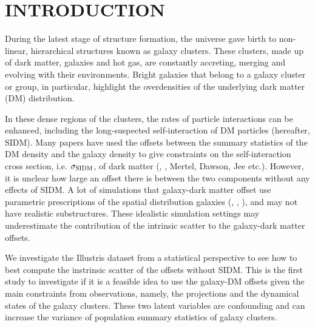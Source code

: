 
\section{INTRODUCTION} 
During the latest stage of structure formation, the universe gave birth to
non-linear, hierarchical structures known as galaxy clusters. 
These clusters, made up of dark matter, galaxies and hot gas,
are constantly accreting, merging and evolving with their
environments. Bright galaxies that belong to a galaxy cluster or group, in 
particular, highlight the overdensities of the underlying dark matter (DM) 
distribution. 


In these dense regions of the clusters, the rates of particle
interactions can be enhanced, including the long-suspected self-interaction of DM
particles (hereafter, SIDM). 
Many papers have used the offsets between the summary statistics of the DM
density and the galaxy density  to give constraints on 
the self-interaction cross
section, i.e. $\sigma_{\rm SIDM}$, of dark matter (\citealt{Markevitch2004}, \citealt{Bradac2006b}, 
Mertel, Dawson, Jee etc.). However, it is unclear how large an offset there is 
between the two components without any effects of SIDM. 
A lot of simulations that galaxy-dark matter offset use
parametric prescriptions of the spatial distribution galaxies 
(\citealt{Kahlhoefer14}, \citealt{Markevitch2004}, \citealt{Robertson2016}), and may not have
realistic substructures. These idealistic simulation settings may underestimate
the contribution of the intrinsic scatter to the galaxy-dark matter offsets. 

We investigate the Illustris dataset from a statistical perspective to see how
to best compute the instrinsic scatter of the offsets without SIDM.  
This is the first study to investigate if it is a feasible
idea to use the galaxy-DM offsets given the main constraints from observations,
namely, the projections and the dynamical states of the galaxy clusters. These
two latent variables are confounding and can increase the variance of
population summary statistics of galaxy clusters.  


